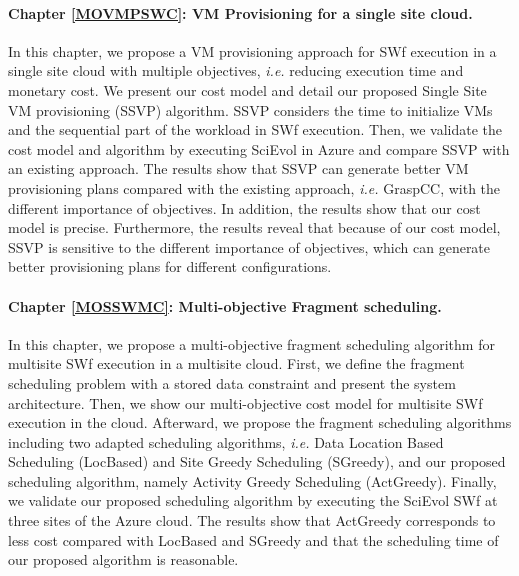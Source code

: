 \paragraph{Chapter \ref{MOVMPSWC}: VM Provisioning for a single site cloud.} In this chapter, we propose a VM provisioning approach for SWf execution in a single site cloud with multiple objectives, \textit{i.e.} reducing execution time and monetary cost. We present our cost model and detail our proposed Single Site VM provisioning (SSVP) algorithm. SSVP considers the time to initialize VMs and the sequential part of the workload in SWf execution. Then, we validate the cost model and algorithm by executing SciEvol in Azure and compare SSVP with an existing approach. The results show that SSVP can generate better VM provisioning plans compared with the existing approach, \textit{i.e.} GraspCC, with the different importance of objectives. In addition, the results show that our cost model is precise. Furthermore, the results reveal that because of our cost model, SSVP is sensitive to the different importance of objectives, which can generate better provisioning plans for different configurations.

\paragraph{Chapter \ref{MOSSWMC}: Multi-objective Fragment scheduling.} In this chapter, we propose a multi-objective fragment scheduling algorithm for multisite SWf execution in a multisite cloud. First, we define the fragment scheduling problem with a stored data constraint and present the system architecture. Then, we show our multi-objective cost model for multisite SWf execution in the cloud. Afterward, we propose the fragment scheduling algorithms including two adapted scheduling algorithms, \textit{i.e.} Data Location Based Scheduling (LocBased) and Site Greedy Scheduling (SGreedy), and our proposed scheduling algorithm, namely Activity Greedy Scheduling (ActGreedy). Finally, we validate our proposed scheduling algorithm by executing the SciEvol SWf at three sites of the Azure cloud. The results show that ActGreedy corresponds to less cost compared with LocBased and SGreedy and that the scheduling time of our proposed algorithm is reasonable.

